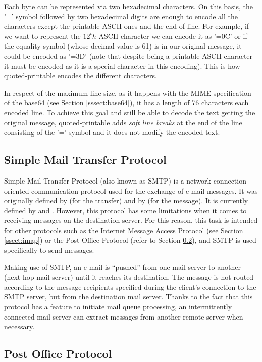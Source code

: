 Each byte can be represented via two hexadecimal characters. On this basis, the '=' symbol followed by two hexadecimal digits are enough to encode all the characters except the printable ASCII ones and the end of line. For example, if we want to represent the $12^th$ ASCII character we can encode it as '=0C' or if the equality symbol (whose decimal value is 61) is in our original message, it could be encoded as '=3D' (note that despite being a printable ASCII character it must be encoded as it is a special character in this encoding). This is how quoted-printable encodes the different characters.

In respect of the maximum line size, as it happens with the MIME specification of the base64 (see Section \ref{sssect:base64}), it has a length of 76 characters each encoded line. To achieve this goal and still be able to decode the text getting the original message, quoted-printable adds \textit{soft line breaks} at the end of the line consisting of the '=' symbol and it does not modify the encoded text.

\subsection{Simple Mail Transfer Protocol} \label{ssect:smtp}

Simple Mail Transfer Protocol (also known as SMTP) is a network connection-oriented communication protocol used for the exchange of e-mail messages. It was originally defined by \cite{rfc821} (for the transfer) and by \cite{rfc822} (for the message). It is currently defined by \cite{rfc5321} and \cite{rfc5322}. However, this protocol has some limitations when it comes to receiving messages on the destination server. For this reason, this task is intended for other protocols such as the Internet Message Access Protocol (see Section \ref{ssect:imap}) or the Post Office Protocol (refer to Section \ref{ssect:pop}), and SMTP is used specifically to send messages.

Making use of SMTP, an e-mail is ``pushed'' from one mail server to another (next-hop mail server) until it reaches its destination. The message is not routed according to the message recipients specified during the client's connection to the SMTP server, but from the destination mail server. Thanks to the fact that this protocol has a feature to initiate mail queue processing, an intermittently connected mail server can extract messages from another remote server when necessary.

\subsection{Post Office Protocol} \label{ssect:pop}

